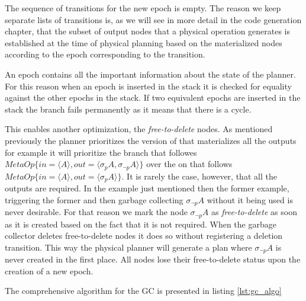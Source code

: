 The sequence of transitions for the new epoch is empty. The reason we
keep separate lists of transitions is, as we will see in more detail
in the code generation chapter, that the subset of output nodes that a
physical operation generates is established at the time of physical
planning based on the materialized nodes according to the epoch
corresponding to the transition.

An epoch contains all the important information about the state of the
planner. For this reason when an epoch is inserted in the stack it is
checked for equality against the other epochs in the stack. If two
equivalent epochs are inserted in the stack the branch fails
permanently as it means that there is a cycle.

This enables another optimization, the \emph{free-to-delete} nodes. As
mentioned previously the planner prioritizes the version of
 that materializes all the outputs for example it will
prioritize the branch that followes
\(MetaOp\{in=\langle A \rangle, out=\langle \sigma_p A, \sigma_{\neg
  p} A \rangle \}\) over the on that follows
\(MetaOp\{in=\langle A \rangle, out=\langle \sigma_p A \rangle
\}\). It is rarely the case, however, that all the outputs are
required. In the example just mentioned then the former example,
triggering the former  and then garbage collecting
\(\sigma_{\neg p} A\) without it being used is never desirable. For
that reason we mark the node \(\sigma_{\neg p} A\) as
\emph{free-to-delete} as soon as it is created based on the fact that
it is not required. When the garbage collector deletes free-to-delete
nodes it does so without registering a deletion transition. This way
the physical planner will generate a plan where \(\sigma_{\neg p} A\)
is never created in the first place. All nodes lose their
free-to-delete status upon the creation of a new epoch.

The comprehensive algorithm for the GC is presented in listing
\ref{lst:gc_algo}

